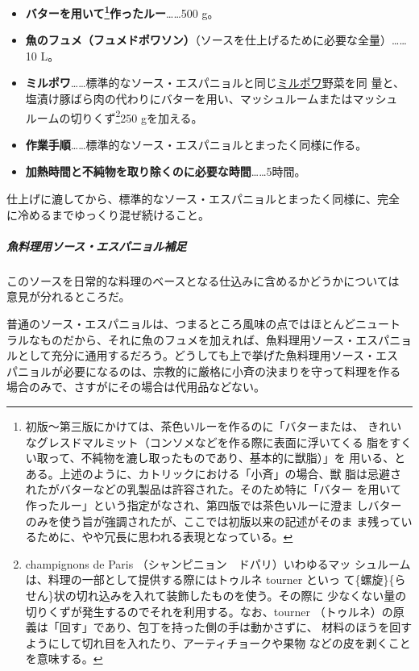 \begin{recette}
\begin{itemize}
\item
  \textbf{バターを用いて\footnote{初版〜第三版にかけては、茶色いルーを作るのに「バターまたは、
    きれいなグレスドマルミット（コンソメなどを作る際に表面に浮いてくる
    脂をすくい取って、不純物を漉し取ったものであり、基本的に獣脂）」を
    用いる、とある。上述のように、カトリックにおける「小斉」の場合、獣
    脂は忌避されたがバターなどの乳製品は許容された。そのため特に「バター
    を用いて作ったルー」という指定がなされ、第四版では茶色いルーに澄ま
    しバターのみを使う旨が強調されたが、ここでは初版以来の記述がそのま
    ま残っているために、やや冗長に思われる表現となっている。}作ったルー}\ldots{}\ldots{}500
  g。
\item
  \textbf{魚のフュメ（フュメドポワソン）}（ソースを仕上げるために必要な全量）\ldots{}\ldots{}10
  L。
\item
  \textbf{ミルポワ}\ldots{}\ldots{}標準的なソース・エスパニョルと同じ\protect\hyperlink{mirepoix}{ミルポワ}野菜を同
  量と、塩漬け豚ばら肉の代わりにバターを用い、マッシュルームまたはマッシュ
  ルームの切りくず\footnote{champignons de Paris
    （シャンピニョン　ドパリ）いわゆるマッ
    シュルームは、料理の一部として提供する際にはトゥルネ tourner といっ
    て\{螺旋\}\{らせん\}状の切れ込みを入れて装飾したものを使う。その際に
    少なくない量の切りくずが発生するのでそれを利用する。なお、tourner
    （トゥルネ）の原義は「回す」であり、包丁を持った側の手は動かさずに、
    材料のほうを回すようにして切れ目を入れたり、アーティチョークや果物
    などの皮を剥くことを意味する。}250 gを加える。
\item
  \textbf{作業手順}\ldots{}\ldots{}標準的なソース・エスパニョルとまったく同様に作る。
\item
  \textbf{加熱時間と不純物を取り除くのに必要な時間}\ldots{}\ldots{}5時間。
\end{itemize}

仕上げに漉してから、標準的なソース・エスパニョルとまったく同様に、完全
に冷めるまでゆっくり混ぜ続けること。

\maeaki

\hypertarget{observation-sauce-espagnole-maigre}{%
\subparagraph{魚料理用ソース・エスパニョル補足}\label{observation-sauce-espagnole-maigre}}

このソースを日常的な料理のベースとなる仕込みに含めるかどうかについては
意見が分れるところだ。

普通のソース・エスパニョルは、つまるところ風味の点ではほとんどニュート
ラルなものだから、それに魚のフュメを加えれば、魚料理用ソース・エスパニョ
ルとして充分に通用するだろう。どうしても上で挙げた魚料理用ソース・エス
パニョルが必要になるのは、宗教的に厳格に小斉の決まりを守って料理を作る
場合のみで、さすがにその場合は代用品などない。


\end{recette}
